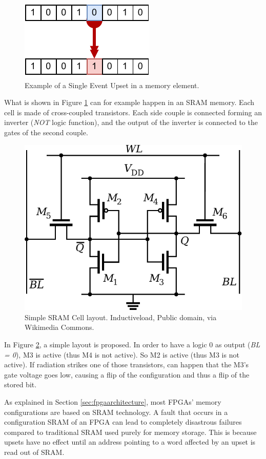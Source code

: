 \begin{figure}[H]
\centering
\includegraphics[height=0.20\linewidth]{images/chapter2/SEU_EXAMPLE.pdf}
\caption{Example of a Single Event Upset in a memory element.}
\label{fig:seu_example}
\end{figure}

What is shown in Figure \ref{fig:seu_example} can for example happen in an SRAM memory. Each cell is made of cross-coupled transistors. Each side couple is connected forming an inverter (\textit{NOT} logic function), and the output of the inverter is connected to the gates of the second couple.  

\begin{figure}[H]
\centering
\includegraphics[height=0.45\linewidth]{images/chapter2/SRAM_CELL.pdf}
\caption{Simple SRAM Cell layout. Inductiveload, Public domain, via Wikimedia Commons.}
\label{fig:sram_cell_layout}
\end{figure}

In Figure \ref{fig:sram_cell_layout}, a simple layout is proposed. In order to have a logic 0 as output (\textit{BL = 0}), M3 is active (thus M4 is not active). So M2 is active (thus M3 is not active). If radiation strikes one of those transistors, can happen that the M3's gate voltage goes low, causing a flip of the configuration and thus a flip of the stored bit. \bigskip

As explained in Section \ref{sec:fpgaarchitecture}, most FPGAs' memory configurations are based on SRAM technology. A fault that occurs in a configuration SRAM of an FPGA can lead to completely disastrous failures compared to traditional SRAM used purely for memory storage. This is because upsets have no effect until an address pointing to a word affected by an upset is read out of SRAM. \bigskip

